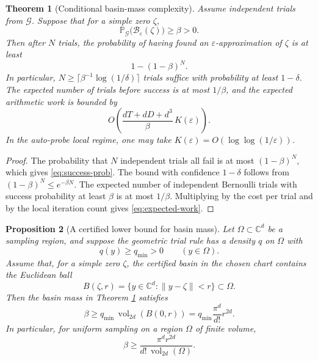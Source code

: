 \documentclass[11pt]{article}
\newtheorem{theorem}{Theorem}[section]
\newtheorem{proposition}[theorem]{Proposition}
\theoremstyle{definition}
\theoremstyle{remark}
\newcommand{\C}{\mathbb{C}}
\newcommand{\norm}[1]{\left\lVert #1\right\rVert}
\newcommand{\zetaRoot}{\zeta}
\begin{document}
\begin{theorem}[Conditional basin-mass complexity]\label{thm:basin-mass}
Assume independent trials from $\mathcal{G}$.  Suppose that for a simple zero $\zetaRoot$,
\[
        \mathbb{P}_{\mathcal{G}}\bigl(\mathcal{B}_{\varepsilon}(\zetaRoot)\bigr)\geq \beta>0.
\]
Then after $N$ trials, the probability of having found an $\varepsilon$-approximation of $\zetaRoot$ is at least
\begin{equation}\label{eq:success-prob}
        1-(1-\beta)^N.
\end{equation}
In particular, $N\geq \lceil \beta^{-1}\log(1/\delta)\rceil$ trials suffice with probability at least $1-\delta$.  The expected number of trials before success is at most $1/\beta$, and the expected arithmetic work is bounded by
\begin{equation}\label{eq:expected-work}
        O\left(
        \frac{dT+dD+d^3}{\beta}\,K(\varepsilon)
        \right).
\end{equation}
In the auto-probe local regime, one may take $K(\varepsilon)=O(\log\log(1/\varepsilon))$.
\end{theorem}

\begin{proof}
The probability that $N$ independent trials all fail is at most $(1-\beta)^N$, which gives \eqref{eq:success-prob}.  The bound with confidence $1-\delta$ follows from $(1-\beta)^N\leq e^{-\beta N}$.  The expected number of independent Bernoulli trials with success probability at least $\beta$ is at most $1/\beta$.  Multiplying by the cost per trial and by the local iteration count gives \eqref{eq:expected-work}.
\end{proof}

\begin{proposition}[A certified lower bound for basin mass]\label{prop:certified-beta}
Let $\Omega\subset\C^d$ be a sampling region, and suppose the geometric trial rule has a density $q$ on $\Omega$ with
\[
        q(y)\geq q_{\min}>0\qquad (y\in\Omega).
\]
Assume that, for a simple zero $\zetaRoot$, the certified basin in the chosen chart contains the Euclidean ball
\[
        B(\zetaRoot,r)=\{y\in\C^d:\norm{y-\zetaRoot}<r\}
        \subset \Omega .
\]
Then the basin mass in Theorem \ref{thm:basin-mass} satisfies
\begin{equation}\label{eq:beta-lower}
        \beta\geq q_{\min}\,\operatorname{vol}_{2d}(B(0,r))
        = q_{\min}\frac{\pi^d}{d!}r^{2d}.
\end{equation}
In particular, for uniform sampling on a region $\Omega$ of finite volume,
\[
        \beta\geq \frac{\pi^d r^{2d}}{d!\,\operatorname{vol}_{2d}(\Omega)}.
\]
\end{proposition}
\end{document}
